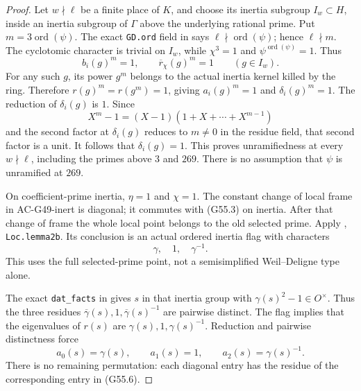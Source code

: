 \begin{proof}
Let $w\nmid\ell$ be a finite place of $K$, and choose
its inertia subgroup $I_w\subset H$, inside an inertia
subgroup of $\Gamma$ above the underlying rational
prime.  Put $m=3\operatorname{ord}(\psi)$.
The exact \texttt{GD.ord} field in
 says
$\ell\nmid\operatorname{ord}(\psi)$; hence $\ell\nmid m$.
The cyclotomic character is trivial on $I_w$, while
$\chi^3=1$ and $\psi^{\operatorname{ord}(\psi)}=1$.
Thus
\[
              b_i(g)^m=1,\qquad
              \overline r_\chi(g)^m=1
                           \qquad(g\in I_w).                 \tag{G55.5}
\]
For any such $g$, its power $g^m$ belongs to the
actual inertia kernel killed by the ring.
Therefore $r(g)^m=r(g^m)=1$, giving
$a_i(g)^m=1$ and $\delta_i(g)^m=1$.
The reduction of $\delta_i(g)$ is $1$.
Since
\[
 X^m-1=(X-1)(1+X+\cdots+X^{m-1})
\]
and the second factor at $\delta_i(g)$ reduces to
$m\ne0$ in the residue field, that second factor is
a unit.  It follows that $\delta_i(g)=1$.
This proves unramifiedness at every $w\nmid\ell$,
including the primes above $3$ and $269$.
There is no assumption that $\psi$ is unramified at
$269$.

On coefficient-prime inertia, $\eta=1$ and $\chi=1$.
The constant change of local frame in AC-G49-inert is
diagonal; it commutes with (G55.3) on inertia.
After that change of frame the whole local point
belongs to the old selected prime.
Apply
,
\texttt{Loc.lemma2b}.
Its conclusion is an actual ordered inertia flag
with characters
\[
                         \gamma,\quad1,\quad\gamma^{-1}.
                                                               \tag{G55.6}
\]
This uses the full selected-prime point, not a
semisimplified Weil--Deligne type alone.

The exact \texttt{dat\_facts} in
 gives
$s$ in that inertia group with
$\gamma(s)^2-1\in O^\times$.
Thus the three residues
$\overline\gamma(s),1,\overline\gamma(s)^{-1}$
are pairwise distinct.
The flag implies that the eigenvalues of $r(s)$
are $\gamma(s),1,\gamma(s)^{-1}$.
Reduction and pairwise distinctness force
\[
                a_0(s)=\gamma(s),\qquad
                a_1(s)=1,\qquad
                a_2(s)=\gamma(s)^{-1}.                       \tag{G55.7}
\]
There is no remaining permutation: each diagonal
entry has the residue of the corresponding entry
in (G55.6).


\end{proof}
